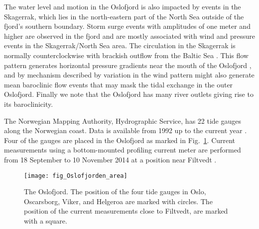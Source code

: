 The water level and motion in the Oslofjord is also impacted by events in the Skagerrak, which lies in the north-eastern part of the North Sea outside of the fjord's southern boundary. Storm surge events with amplitudes of one meter and higher are observed in the fjord and are mostly associated with wind and pressure events in the Skagerrak/North Sea area. The circulation in the Skagerrak is normally counterclockwise with brackish outflow from the Baltic Sea \cite[]{rodhe96,svendsen96}. This flow pattern generates horizontal pressure gradients near the mouth of the Oslofjord \cite[]{baals90}, and by mechanism described by \cite{klinck81} variation in the wind pattern might also generate mean baroclinic flow events that may mask the tidal exchange in the outer Oslofjord.
Finally we note that the Oslofjord has many river outlets giving rise to its baroclinicity. 

The Norwegian Mapping Authority, Hydrographic Service, has 22 tide gauges along the Norwegian coast. Data is available from 1992 up to the current year \cite[]{tide16}. Four of the gauges are placed in the Oslofjord as marked in  Fig.~\ref{fig:area1}.
Current measurements using a bottom-mounted profiling current meter are performed from 18 September to 10 November 2014 at a position near Filtvedt \cite[]{hjelmervik17}.

\begin{figure}[htb]
\centering
\texttt{[image: fig\_Oslofjorden\_area]}
\caption{The Oslofjord. The position of the four tide gauges in Oslo, Oscarsborg, Viker, and Helgeroa are marked with circles. The position of the current measurements close to Filtvedt, are marked with a square.}
\label{fig:area1}
\end{figure}

